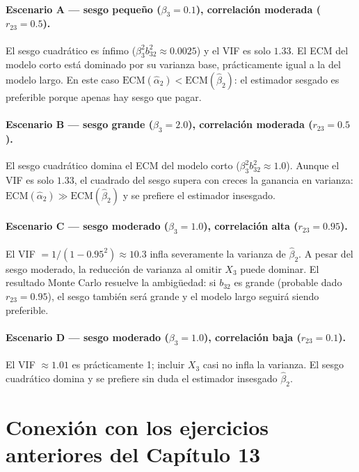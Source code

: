 \documentclass[12pt, letterpaper]{article}
\begin{document}
\paragraph{Escenario A --- sesgo pequeño ($\beta_3 = 0.1$), correlación
moderada ($r_{23} = 0.5$).}
El sesgo cuadrático es ínfimo ($\beta_3^2 b_{32}^2 \approx 0.0025$) y el VIF
es solo $1.33$. El ECM del modelo corto está dominado por su varianza base,
prácticamente igual a la del modelo largo. En este caso
$\mathrm{ECM}(\hat{\alpha}_2) < \mathrm{ECM}(\hat{\beta}_2)$: el estimador
sesgado es preferible porque apenas hay sesgo que pagar.

\paragraph{Escenario B --- sesgo grande ($\beta_3 = 2.0$), correlación
moderada ($r_{23} = 0.5$).}
El sesgo cuadrático domina el ECM del modelo corto
($\beta_3^2 b_{32}^2 \approx 1.0$). Aunque el VIF es solo $1.33$, el cuadrado
del sesgo supera con creces la ganancia en varianza:
$\mathrm{ECM}(\hat{\alpha}_2) \gg \mathrm{ECM}(\hat{\beta}_2)$ y se prefiere
el estimador insesgado.

\paragraph{Escenario C --- sesgo moderado ($\beta_3 = 1.0$), correlación alta
($r_{23} = 0.95$).}
El VIF $= 1/(1 - 0.95^2) \approx 10.3$ infla severamente la varianza de
$\hat{\beta}_2$. A pesar del sesgo moderado, la reducción de varianza al omitir
$X_3$ puede dominar. El resultado Monte Carlo resuelve la ambigüedad: si
$b_{32}$ es grande (probable dado $r_{23} = 0.95$), el sesgo también será
grande y el modelo largo seguirá siendo preferible.

\paragraph{Escenario D --- sesgo moderado ($\beta_3 = 1.0$), correlación baja
($r_{23} = 0.1$).}
El VIF $\approx 1.01$ es prácticamente 1; incluir $X_3$ casi no infla la
varianza. El sesgo cuadrático domina y se prefiere sin duda el estimador
insesgado $\hat{\beta}_2$.

\section{Conexión con los ejercicios anteriores del Capítulo 13}
\end{document}
